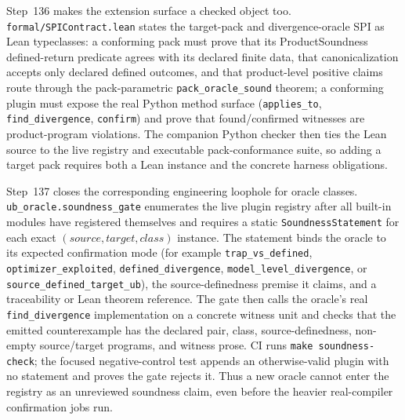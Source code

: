 \documentclass[10pt,a4paper]{article}
\begin{document}
Step~136 makes the extension surface a checked object too.
\texttt{formal/SPIContract.lean} states the target-pack and divergence-oracle
SPI as Lean typeclasses: a conforming pack must prove that its ProductSoundness
defined-return predicate agrees with its declared finite data, that
canonicalization accepts only declared defined outcomes, and that product-level
positive claims route through the pack-parametric \texttt{pack\_oracle\_sound}
theorem; a conforming plugin must expose the real Python method surface
(\texttt{applies\_to}, \texttt{find\_divergence}, \texttt{confirm}) and prove
that found/confirmed witnesses are product-program violations.  The companion
Python checker then ties the Lean source to the live registry and executable
pack-conformance suite, so adding a target pack requires both a Lean instance and
the concrete harness obligations.

Step~137 closes the corresponding engineering loophole for oracle classes.
\texttt{ub\_oracle.soundness\_gate} enumerates the live plugin registry after all
built-in modules have registered themselves and requires a static
\texttt{SoundnessStatement} for each exact
\((\mathit{source},\mathit{target},\mathit{class})\) instance.  The statement
binds the oracle to its expected confirmation mode (for example
\texttt{trap\_vs\_defined}, \texttt{optimizer\_exploited},
\texttt{defined\_divergence}, \texttt{model\_level\_divergence}, or
\texttt{source\_defined\_target\_ub}), the source-definedness premise it claims,
and a traceability or Lean theorem reference.  The gate then calls the oracle's
real \texttt{find\_divergence} implementation on a concrete witness unit and
checks that the emitted counterexample has the declared pair, class,
source-definedness, non-empty source/target programs, and witness prose.  CI runs
\texttt{make soundness-check}; the focused negative-control test appends an
otherwise-valid plugin with no statement and proves the gate rejects it.  Thus a
new oracle cannot enter the registry as an unreviewed soundness claim, even before
the heavier real-compiler confirmation jobs run.
\end{document}
